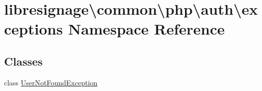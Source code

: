 \hypertarget{namespacelibresignage_1_1common_1_1php_1_1auth_1_1exceptions}{}\section{libresignage\textbackslash{}common\textbackslash{}php\textbackslash{}auth\textbackslash{}exceptions Namespace Reference}
\label{namespacelibresignage_1_1common_1_1php_1_1auth_1_1exceptions}
\subsection*{Classes}
\begin{DoxyCompactItemize}
\item 
class \hyperlink{classlibresignage_1_1common_1_1php_1_1auth_1_1exceptions_1_1UserNotFoundException}{User\+Not\+Found\+Exception}
\end{DoxyCompactItemize}
